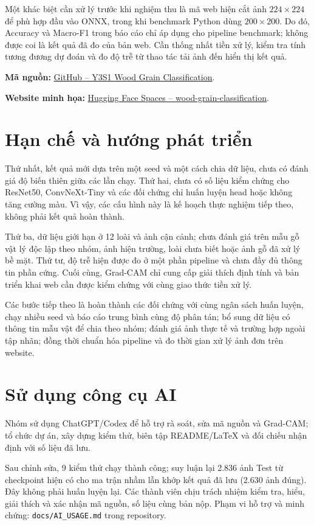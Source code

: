 \documentclass[conference]{IEEEtran}
\begin{document}
Một khác biệt cần xử lý trước khi nghiệm thu là mã web hiện cắt ảnh $224\times224$ để phù hợp đầu vào ONNX, trong khi benchmark Python dùng $200\times200$. Do đó, Accuracy và Macro-F1 trong báo cáo chỉ áp dụng cho pipeline benchmark; không được coi là kết quả đã đo của bản web. Cần thống nhất tiền xử lý, kiểm tra tính tương đương dự đoán và đo độ trễ từ thao tác tải ảnh đến hiển thị kết quả.

\noindent\textbf{Mã nguồn:} \href{https://github.com/Anomal-gre/Y3S1_Wood_Grain_Classification}{GitHub -- Y3S1 Wood Grain Classification}.

\noindent\textbf{Website minh họa:} \href{https://huggingface.co/spaces/AnomalGreatad/wood-grain-classification}{Hugging Face Spaces -- wood-grain-classification}.

\section{Hạn chế và hướng phát triển}
Thứ nhất, kết quả mới dựa trên một seed và một cách chia dữ liệu, chưa có đánh giá độ biến thiên giữa các lần chạy. Thứ hai, chưa có số liệu kiểm chứng cho ResNet50, ConvNeXt-Tiny và các đối chứng chỉ huấn luyện head hoặc không tăng cường màu. Vì vậy, các cấu hình này là kế hoạch thực nghiệm tiếp theo, không phải kết quả hoàn thành.

Thứ ba, dữ liệu giới hạn ở 12 loài và ảnh cận cảnh; chưa đánh giá trên mẫu gỗ vật lý độc lập theo nhóm, ảnh hiện trường, loài chưa biết hoặc ảnh gỗ đã xử lý bề mặt. Thứ tư, độ trễ hiện được đo ở một phần pipeline và chưa đầy đủ thông tin phần cứng. Cuối cùng, Grad-CAM chỉ cung cấp giải thích định tính và bản triển khai web cần được kiểm chứng với cùng giao thức tiền xử lý.

Các bước tiếp theo là hoàn thành các đối chứng với cùng ngân sách huấn luyện, chạy nhiều seed và báo cáo trung bình cùng độ phân tán; bổ sung dữ liệu có thông tin mẫu vật để chia theo nhóm; đánh giá ảnh thực tế và trường hợp ngoài tập nhãn; đồng thời chuẩn hóa pipeline và đo thời gian xử lý ảnh đơn trên website.

\section{Sử dụng công cụ AI}
Nhóm sử dụng ChatGPT/Codex để hỗ trợ rà soát, sửa mã nguồn và Grad-CAM; tổ chức dự án, xây dựng kiểm thử, biên tập README/LaTeX và đối chiếu nhận định với số liệu đã lưu.

Sau chỉnh sửa, 9 kiểm thử chạy thành công; suy luận lại 2.836 ảnh Test từ checkpoint hiện có cho ma trận nhầm lẫn khớp kết quả đã lưu (2.630 ảnh đúng). Đây không phải huấn luyện lại. Các thành viên chịu trách nhiệm kiểm tra, hiểu, giải thích và xác nhận mã nguồn, số liệu cùng bản nộp. Phạm vi hỗ trợ và minh chứng: \texttt{docs/AI\_USAGE.md} trong repository.
\end{document}
